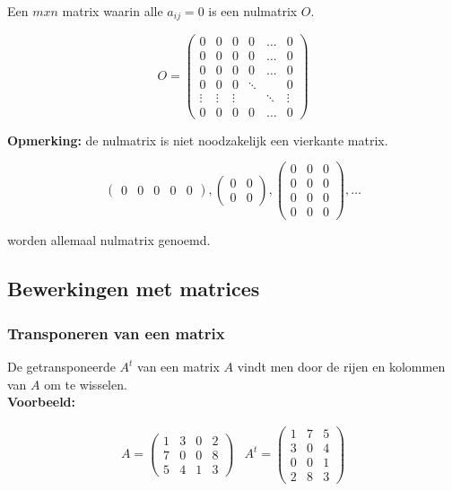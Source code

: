 \begin{itemize}
Een $mxn$ matrix waarin alle $a_{ij}=0$ is een nulmatrix $O$. 

\[
O= \left( \begin{matrix}
0 & 0 & 0 & 0 & \ldots & 0 \\
0 & 0 & 0 & 0 & \ldots & 0 \\
0 & 0 & 0 & 0 & \ldots & 0 \\
0 & 0 & 0 & \ddots &  & 0 \\
\vdots & \vdots & \vdots &  & \ddots & \vdots \\
0 & 0 & 0 & 0 & \ldots & 0
\end{matrix} \right)
\]

\end{itemize}


{\bf Opmerking:} de nulmatrix is niet noodzakelijk een vierkante matrix.

\[  
\left( \begin{matrix}
0 & 0 & 0 & 0 & 0\end{matrix} \right) , \left( \begin{matrix} 
0 & 0 \\
0 & 0 \end{matrix} \right) , \left( \begin{matrix} 
0 & 0 & 0 \\
0 & 0 & 0 \\
0 & 0 & 0 \\
0 & 0 & 0 \end{matrix} \right) , \ldots                                            
\] 

worden allemaal nulmatrix genoemd.\\

\subsection{Bewerkingen met matrices}

\subsubsection{Transponeren van een matrix}

De getransponeerde $A^t$ van een matrix $A$ vindt men door de rijen en kolommen van $A$ om te wisselen.\\

{\bf Voorbeeld:}

\[ \begin{array}{ll}
A= \left( \begin{matrix}
1 & 3 & 0 & 2 \\
7 & 0 & 0 & 8 \\
5 & 4 & 1 & 3
\end{matrix} \right) &
A^t = \left( \begin{matrix}
1 & 7 & 5 \\
3 & 0 & 4 \\
0 & 0 & 1 \\
2 & 8 & 3
\end{matrix}
\right)
\end{array}
\]

